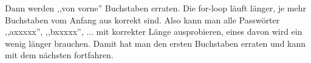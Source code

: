 \documentclass[a4paper,11pt]{article}
\begin{document}
\begin{enumerate}
\begin{enumerate}
            Dann werden ,,von vorne'' Buchstaben erraten. Die for-loop läuft länger, je mehr Buchstaben vom Anfang aus korrekt sind. Also kann man alle Passwörter ,,axxxxx'', ,,bxxxxx'', ... mit korrekter Länge ausprobieren, eines davon wird ein wenig länger brauchen. Damit hat man den ersten Buchstaben erraten und kann mit dem nächsten fortfahren.

    \end{enumerate}

\end{enumerate}
\end{document}
